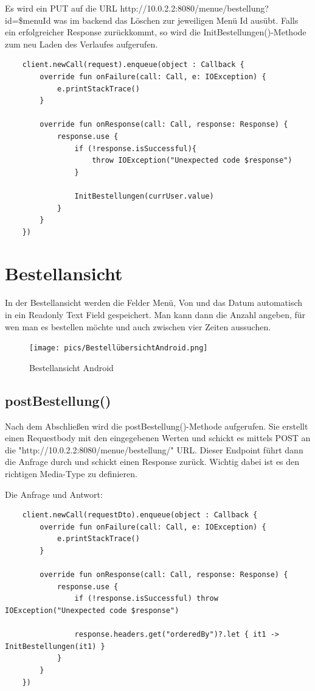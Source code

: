 Es wird ein PUT auf die URL http://10.0.2.2:8080/menue/bestellung?id=\$menuId was im backend das Löschen zur jeweiligen Menü Id ausübt.
Falls ein erfolgreicher Response zurückkommt, so wird die InitBestellungen()-Methode zum neu Laden des Verlaufes aufgerufen.

\begin{lstlisting}
    client.newCall(request).enqueue(object : Callback {
        override fun onFailure(call: Call, e: IOException) {
            e.printStackTrace()
        }

        override fun onResponse(call: Call, response: Response) {
            response.use {
                if (!response.isSuccessful){
                    throw IOException("Unexpected code $response")
                }

                InitBestellungen(currUser.value)
            }
        }
    })
\end{lstlisting}


\pagebreak


\section{Bestellansicht}

In der Bestellansicht werden die Felder Menü, Von und das Datum automatisch in ein Readonly Text Field gespeichert.
Man kann dann die Anzahl angeben, für wen man es bestellen möchte und auch zwischen vier Zeiten aussuchen. 

\begin{figure}[htp]
    \centering
    \author{Bozidar Spasenovic}
    \texttt{[image: pics/BestellübersichtAndroid.png]}
    \caption{Bestellansicht Android}
    \label{fig:impl:BestellübersichtAndroid}
\end{figure}

\subsection{postBestellung()}
Nach dem Abschließen wird die postBestellung()-Methode aufgerufen. Sie erstellt einen Requestbody mit den eingegebenen Werten
und schickt es mittels POST an die "http://10.0.2.2:8080/menue/bestellung/" URL. Dieser Endpoint führt dann die Anfrage durch und schickt einen Response zurück.
Wichtig dabei ist es den richtigen Media-Type zu definieren. 

Die Anfrage und Antwort:
\begin{lstlisting}
    client.newCall(requestDto).enqueue(object : Callback {
        override fun onFailure(call: Call, e: IOException) {
            e.printStackTrace()
        }

        override fun onResponse(call: Call, response: Response) {
            response.use {
                if (!response.isSuccessful) throw IOException("Unexpected code $response")

                response.headers.get("orderedBy")?.let { it1 -> InitBestellungen(it1) }
            }
        }
    })
\end{lstlisting}


